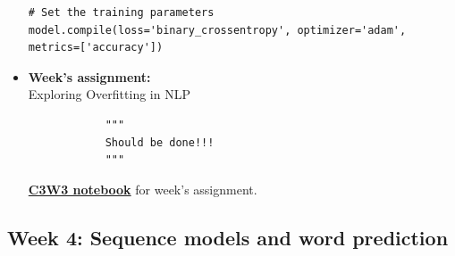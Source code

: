 \documentclass[20pt]{article}
\newcommand{\speciallink}[2]{\textbf{\textcolor{red}{\href{#1}{#2}}}}
\begin{document}
\begin{itemize}
\begin{verbatim}
# Set the training parameters
model.compile(loss='binary_crossentropy', optimizer='adam', metrics=['accuracy'])
	 	\end{verbatim}
 		\item \textbf{Week's assignment:}\\
 		Exploring Overfitting in NLP
 		\begin{verbatim}
 			"""
 			Should be done!!!
 			"""
 		\end{verbatim}
 		\speciallink{https://drive.google.com/file/d/1sQOl4BkwqiUkwrYJPIhxUauTC0CikoSN/view?usp=drive\_link}{C3W3 notebook} for week's assignment.		
	\end{itemize}
	\subsection{Week 4: Sequence models and word prediction}
\end{document}
